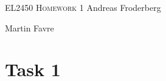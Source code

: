 \documentclass[10pt, a4paper]{article}
\begin{document}
\begin{titlepage}
\centering
{
 \scshape \LARGE 
EL2450 Homework 1
}
\vfill
Andreas Froderberg
\par
Martin Favre
\end{titlepage}

\section*{Task 1}
\end{document}
